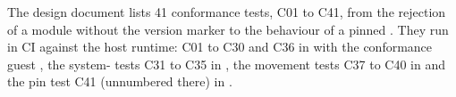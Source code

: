 The design document lists 41 conformance tests, C01 to C41, from the
rejection of a module without the version marker to the behaviour of a
pinned \paglet{}. They run in CI against the host runtime: C01 to C30 and
C36 in  with the conformance guest
, the system-\paglet{} tests C31
to C35 in , the movement tests C37 to C40
in  and the pin test C41 (unnumbered
there) in .
\par\endgroup
